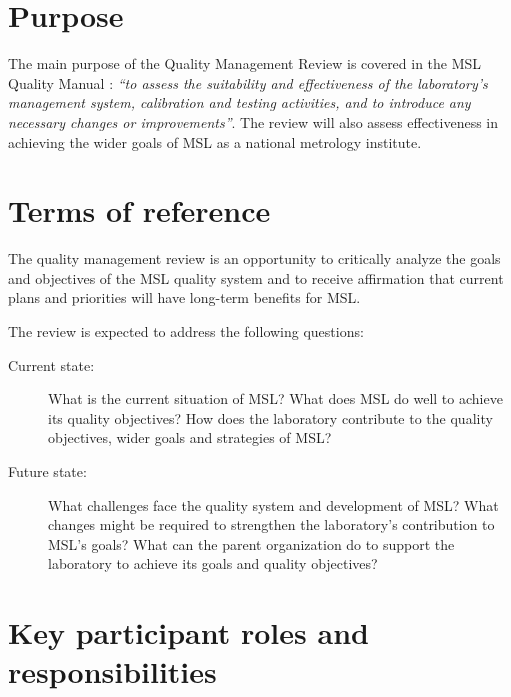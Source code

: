 \section{Purpose}
The main purpose of the Quality Management Review is covered in the MSL Quality Manual \cite[\S\ref*{QM-ss:management_review}]{MSL_Quality_Manual}: 
\textit{``to assess the suitability and effectiveness of the laboratory's management
system, calibration and testing activities, and to introduce any necessary changes or improvements''}. The review will also assess effectiveness in achieving the wider goals of MSL as a
national metrology institute.

\section{Terms of reference}
The quality management review is an opportunity to critically analyze the goals and objectives of the MSL quality system and to receive affirmation that current plans and priorities
will have long-term benefits for MSL.

The review is expected to address the following questions:
\begin{description}
\item[Current state: ]What is the current situation of MSL? What does MSL do well to achieve
its quality objectives? How does the laboratory contribute to the quality objectives, wider
goals and strategies of MSL?

\item[Future state: ]What challenges face the quality system and development of MSL? What
changes might be required to strengthen the laboratory’s contribution to MSL’s goals? What
can the parent organization do to support the laboratory to achieve its goals and quality
objectives?
\end{description}


\section{Key participant roles and responsibilities}
